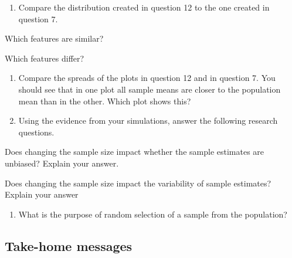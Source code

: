 \documentclass[
]{report}
\providecommand{\tightlist}{%
  \setlength{\itemsep}{0pt}\setlength{\parskip}{0pt}}
\newcommand{\rgi}{\hspace{24pt}}  %
\begin{document}
\begin{enumerate}
\def\labelenumi{\arabic{enumi}.}
\setcounter{enumi}{12}
\tightlist
\item
  Compare the distribution created in question 12 to the one created in question 7.
\end{enumerate}

\rgi Which features are similar?\\
\vspace{0.3in}

\rgi Which features differ?

\vspace{0.3in}

\newpage

\begin{enumerate}
\def\labelenumi{\arabic{enumi}.}
\setcounter{enumi}{13}
\item
  Compare the spreads of the plots in question 12 and in question 7. You should see that in one plot all sample means are closer to the population mean than in the other. Which plot shows this?
  \vspace{0.4in}
\item
  Using the evidence from your simulations, answer the following research questions.
\end{enumerate}

\rgi Does changing the sample size impact whether the sample estimates are unbiased? Explain your answer.
\vspace{0.5in}

\rgi Does changing the sample size impact the variability of sample estimates? Explain your answer
\vspace{0.5in}

\begin{enumerate}
\def\labelenumi{\arabic{enumi}.}
\setcounter{enumi}{15}
\tightlist
\item
  What is the purpose of random selection of a sample from the population?
\end{enumerate}

\vspace{0.8in}

\hypertarget{take-home-messages-2}{%
\subsection{Take-home messages}\label{take-home-messages-2}}
\end{document}

